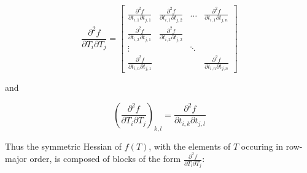 \documentclass{report}
\begin{document}
\begin{equation}
\frac{\partial^2 f}{\partial T_i \partial T_j} = 
\left[ \begin{array}{cccc}
\frac{\partial^2 f}{\partial t_{i,1} \partial t_{j,1}} &
\frac{\partial^2 f}{\partial t_{i,1} \partial t_{j,2}} &
\ldots &
\frac{\partial^2 f}{\partial t_{i,1} \partial t_{j,n}} \\
\frac{\partial^2 f}{\partial t_{i,2} \partial t_{j,1}} &
\frac{\partial^2 f}{\partial t_{i,2} \partial t_{j,2}} \\
\vdots & & \ddots \\
\frac{\partial^2 f}{\partial t_{i,n} \partial t_{j,1}} & & &
\frac{\partial^2 f}{\partial t_{i,n} \partial t_{j,n}}
\end{array} \right]
\end{equation}

and

\begin{equation}
\label{dsecelem}
\left(\frac{\partial^2 f}{\partial T_i \partial T_j}\right)_{k,l} = 
\frac{\partial^2 f}{\partial t_{i,k} \partial t_{j,l}}
\end{equation}

Thus the symmetric Hessian of $f(T)$, with the elements of $T$ occuring in row-major order, is composed of blocks of the form $\frac{\partial^2 f}{\partial T_i \partial T_j}$:
\end{document}
